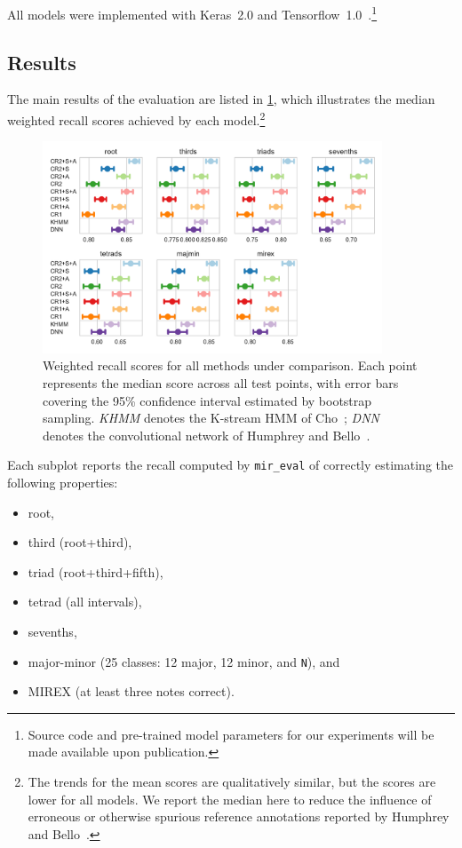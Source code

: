 \documentclass{article}
\begin{document}
All models were implemented with Keras~2.0 and Tensorflow~1.0~\cite{chollet2015keras, tensorflow2015-whitepaper}.\footnote{Source code and pre-trained model parameters for our experiments will be made available upon publication.}

\subsection{Results}

The main results of the evaluation are listed in \cref{fig:results}, which illustrates the median weighted recall scores achieved by each model.\footnote{The trends for the mean scores are qualitatively similar, but the scores are lower for all models. We report the median here to reduce the influence of erroneous or otherwise spurious reference annotations reported by Humphrey and Bello~\cite{humphrey2015four}.}
\begin{figure}[t]
    \centering
    \includegraphics[width=0.9\textwidth]{crnn-scores}
    \caption{Weighted recall scores for all methods under comparison.  Each point represents the median score across all test points, with error bars covering the 95\% confidence interval estimated by bootstrap sampling.
        \emph{KHMM} denotes the K-stream HMM of Cho~\cite{cho2014improved}; \emph{DNN} denotes the convolutional network of Humphrey and Bello~\cite{humphrey2015four}.\label{fig:results}}
\end{figure}
Each subplot reports the recall computed by \texttt{mir\_eval} of correctly estimating the following properties:
\begin{itemize}
    \item root,
    \item third (root+third),
    \item triad (root+third+fifth),
    \item tetrad (all intervals),
    \item sevenths, 
    \item major-minor (25 classes: 12 major, 12 minor, and \texttt{N}), and
    \item MIREX (at least three notes correct).
\end{itemize}
\end{document}
